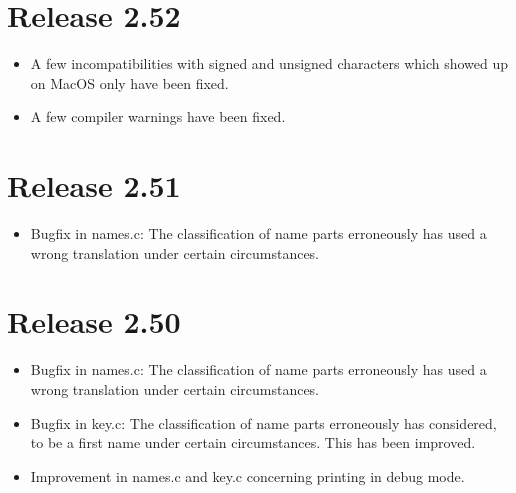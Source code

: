 \documentclass[11pt,a4paper]{scrartcl}
\newcommand\File[1]{\textsf{#1}}
\newenvironment{Release}[2]{\section*{Release #1}\begin{itemize}}{\end{itemize}}
\newenvironment{Fix}[1]{\item }{}
\begin{document}
 \begin{Release}{2.52}{June 6, 2011}
  \begin{Fix}{gene}
    A few incompatibilities with signed and unsigned characters which showed up
    on MacOS only have been fixed.
  \end{Fix}
  \begin{Fix}{gene}
    A few compiler warnings have been fixed.
  \end{Fix}
 \end{Release}

 \begin{Release}{2.51}{May 12, 2010}
  \begin{Fix}{gene}
    Bugfix in \File{names.c}: The classification of name parts
    erroneously has used a wrong translation under certain circumstances.
  \end{Fix}
 \end{Release}

 \begin{Release}{2.50}{May 12, 2010}
  \begin{Fix}{gene}
    Bugfix in \File{names.c}: The classification of name parts erroneously has
    used a wrong translation under certain circumstances.
  \end{Fix}
  \begin{Fix}{gene}
    Bugfix in \File{key.c}: The classification of name parts erroneously has
    considered, to be a first name under certain circumstances. This has been
    improved.
  \end{Fix}
  \begin{Fix}{gene}
    Improvement in \File{names.c} and \File{key.c} concerning printing in
    debug mode.
  \end{Fix}
 \end{Release}
\end{document}
